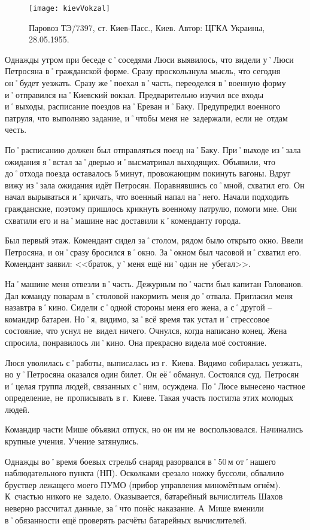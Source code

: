 \begin{wrapfigure}{O}{.4\textwidth}
\centering
\texttt{[image: kievVokzal]}
\caption{Паровоз ТЭ\=/7397, ст. Киев-Пасс., Киев. Автор: ЦГКА Украины, 28.05.1955.}
\label{fig:kievVokzal}
\end{wrapfigure}

Однажды утром при беседе с˚соседями Люси выявилось, что видели у˚Люси Петросяна в˚гражданской форме. Сразу проскользнула мысль, что сегодня он˚будет уезжать. Сразу же˚поехал в˚часть, переоделся в˚военную форму и˚отправился на˚Киевский вокзал. Предварительно изучил все входы и˚выходы, расписание поездов на˚Ереван и˚Баку. Предупредил военного патруля, что выполняю задание, и˚чтобы меня не~задержали, если не~отдам честь. 

По˚расписанию должен был отправляться поезд на˚Баку. При˚выходе из˚зала ожидания я˚встал за˚дверью и˚высматривал выходящих. Объявили, что до˚отхода поезда оставалось 5\,минут, провожающим покинуть вагоны. Вдруг вижу из˚зала ожидания идёт Петросян. Поравнявшись со˚мной, схватил его. Он начал вырываться и˚кричать, что военный напал на˚него. Начали подходить гражданские, поэтому пришлось крикнуть военному патрулю, помоги мне. Они схватили его и на˚машине нас доставили к˚коменданту города. 

Был первый этаж. Комендант сидел за˚столом, рядом было открыто окно. Ввели Петросяна, и он˚сразу бросился в˚окно. За˚окном был часовой и˚схватил его. Комендант заявил: <<браток, у˚меня ещё ни˚один не~убегал>>. 

На˚машине меня отвезли в˚часть. Дежурным по˚части был капитан Голованов. Дал команду поварам в˚столовой накормить меня до˚отвала. Пригласил меня назавтра в˚кино. Сидели с˚одной стороны меня его жена, а с˚другой \--- командир батареи. Но˚я, видимо, за˚всё время так устал и˚стрессовое состояние, что уснул не~видел ничего. Очнулся, когда написано конец. Жена спросила, понравилось ли˚кино. Она прекрасно видела моё состояние. 

Люся уволилась с˚работы, выписалась из г.~Киева. Видимо собиралась уезжать, но у˚Петросяна оказался один билет. Он её˚обманул. Состоялся суд. Петросян и˚целая группа людей, связанных с˚ним, осуждена. По˚Люсе вынесено частное определение, не~прописывать в г.~Киеве. Такая участь постигла этих молодых людей.

Командир части Мише объявил отпуск, но он им не~воспользовался. Начинались крупные учения. Учение затянулись.

Однажды во˚время боевых стрельб снаряд разорвался в˚50\,м от˚нашего наблюдательного пункта (НП). Осколками срезало ножку буссоли, обвалило бруствер лежащего моего ПУМО (прибор управления миномётным огнём). К~счастью никого не~задело. Оказывается, батарейный вычислитель Шахов неверно рассчитал данные, за˚что понёс наказание. А~Мише вменили в˚обязанности ещё проверять расчёты батарейных вычислителей. 

